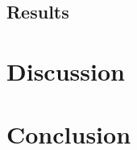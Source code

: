 \documentclass[a4paper,fleqn]{cas-sc}
\begin{document}
\subsection{Results}\label{subsec:results}

\section{Discussion}\label{sec:discussion}

\section{Conclusion}\label{sec:conclusion}




%





\end{document}

